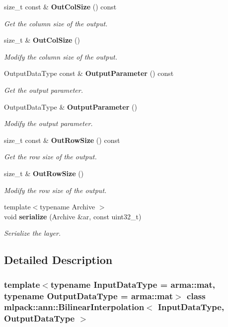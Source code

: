 \begin{DoxyCompactItemize}
size\+\_\+t const  \& \textbf{ Out\+Col\+Size} () const
\begin{DoxyCompactList}\small\item\em Get the column size of the output. \end{DoxyCompactList}\item 
size\+\_\+t \& \textbf{ Out\+Col\+Size} ()
\begin{DoxyCompactList}\small\item\em Modify the column size of the output. \end{DoxyCompactList}\item 
Output\+Data\+Type const  \& \textbf{ Output\+Parameter} () const
\begin{DoxyCompactList}\small\item\em Get the output parameter. \end{DoxyCompactList}\item 
Output\+Data\+Type \& \textbf{ Output\+Parameter} ()
\begin{DoxyCompactList}\small\item\em Modify the output parameter. \end{DoxyCompactList}\item 
size\+\_\+t const  \& \textbf{ Out\+Row\+Size} () const
\begin{DoxyCompactList}\small\item\em Get the row size of the output. \end{DoxyCompactList}\item 
size\+\_\+t \& \textbf{ Out\+Row\+Size} ()
\begin{DoxyCompactList}\small\item\em Modify the row size of the output. \end{DoxyCompactList}\item 
{\footnotesize template$<$typename Archive $>$ }\\void \textbf{ serialize} (Archive \&ar, const uint32\+\_\+t)
\begin{DoxyCompactList}\small\item\em Serialize the layer. \end{DoxyCompactList}\end{DoxyCompactItemize}


\subsection{Detailed Description}
\subsubsection*{template$<$typename Input\+Data\+Type = arma\+::mat, typename Output\+Data\+Type = arma\+::mat$>$\newline
class mlpack\+::ann\+::\+Bilinear\+Interpolation$<$ Input\+Data\+Type, Output\+Data\+Type $>$}

